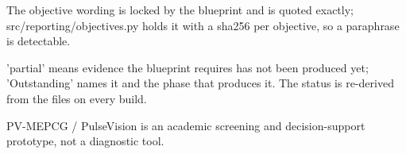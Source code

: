 \begin{table}[htbp]
\begin{tabular}{lrrrrrrrrrr}
    \bottomrule
  \end{tabular}
  \par\footnotesize The objective wording is locked by the blueprint and is quoted exactly; src/reporting/objectives.py holds it with a sha256 per objective, so a paraphrase is detectable.
  \par\footnotesize 'partial' means evidence the blueprint requires has not been produced yet; 'Outstanding' names it and the phase that produces it. The status is re-derived from the files on every build.
  \par\footnotesize PV-MEPCG / PulseVision is an academic screening and decision-support prototype, not a diagnostic tool.
\end{table}
